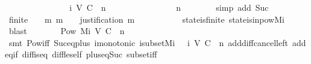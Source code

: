 \begin{isabellebody}
\ \ \isamarkupfalse%
\ {\isacharminus}\isanewline
\ \ \isamarkupfalse%
\ {\isasymsigma}\ {\isasymsigma}{\isacharprime}\isanewline
\ \ \isamarkupfalse%
\ {\isachardoublequoteopen}{\isasymsigma}{\isacharprime}\ {\isasymin}\ {\isasymSigma}i\ {\isacharparenleft}V{\isacharcomma}\ C{\isacharcomma}\ {\isasymepsilon}{\isacharparenright}\ n{\isachardoublequoteclose}\isanewline
\ \ \ {\isachardoublequoteopen}{\isasymsigma}\ {\isasymsubseteq}\ {\isasymsigma}{\isacharprime}{\isachardoublequoteclose}\ \isanewline
\ \ \ {\isachardoublequoteopen}{\isasymsigma}\ {\isasymin}\ {\isasymSigma}{\isachardoublequoteclose}\isanewline
\ \ \isamarkupfalse%
\ {\isachardoublequoteopen}n\ {\isachargreater}\ {}{\isachardoublequoteclose}\isanewline
\ \ \ \ \isamarkupfalse%
\ {\isacharparenleft}simp\ add{\isacharcolon}\ Suc{\isacharparenright}\isanewline
\ \ \isamarkupfalse%
\ {\isachardoublequoteopen}finite\ {\isasymsigma}\ {\isasymand}\ {\isacharparenleft}{\isasymforall}\ m{\isachardot}\ m\ {\isasymin}\ {\isasymsigma}\ {\isasymlongrightarrow}\ justification\ m\ {\isasymsubseteq}\ {\isasymsigma}{\isacharparenright}{\isachardoublequoteclose}\isanewline
\ \ \ \ \isamarkupfalse%
\ {\isacartoucheopen}{\isasymsigma}\ {\isasymin}\ {\isasymSigma}{\isacartoucheclose}\ state{\isacharunderscore}is{\isacharunderscore}finite\ state{\isacharunderscore}is{\isacharunderscore}in{\isacharunderscore}pow{\isacharunderscore}Mi\ \isamarkupfalse%
\ blast\isanewline
\ \ \isamarkupfalse%
\ \isamarkupfalse%
\ {\isachardoublequoteopen}{\isasymsigma}\ {\isasymin}\ Pow\ {\isacharparenleft}Mi\ {\isacharparenleft}V{\isacharcomma}\ C{\isacharcomma}\ {\isasymepsilon}{\isacharparenright}\ {\isacharparenleft}n\ {\isacharminus}\ {}{\isacharparenright}{\isacharparenright}{\isachardoublequoteclose}\isanewline
\ \ \ \ \isamarkupfalse%
\ {\isacartoucheopen}{\isasymsigma}\ {\isasymsubseteq}\ {\isasymsigma}{\isacharprime}{\isacartoucheclose}\isanewline
\ \ \ \ \isamarkupfalse%
\ {\isacharparenleft}smt\ Pow{\isacharunderscore}iff\ Suc{\isacharunderscore}eq{\isacharunderscore}plus{}\ {\isasymSigma}i{\isacharunderscore}monotonic\ {\isasymSigma}i{\isacharunderscore}subset{\isacharunderscore}Mi\ {\isacartoucheopen}{\isasymsigma}{\isacharprime}\ {\isasymin}\ {\isasymSigma}i\ {\isacharparenleft}V{\isacharcomma}\ C{\isacharcomma}\ {\isasymepsilon}{\isacharparenright}\ n{\isacartoucheclose}\ add{\isacharunderscore}diff{\isacharunderscore}cancel{\isacharunderscore}left{\isacharprime}\ add{\isacharunderscore}eq{\isacharunderscore}if\ diff{\isacharunderscore}is{\isacharunderscore}{}{\isacharunderscore}eq\ diff{\isacharunderscore}le{\isacharunderscore}self\ plus{\isacharunderscore}{}{\isacharunderscore}eq{\isacharunderscore}Suc\ subset{\isacharunderscore}iff{\isacharparenright}\isanewline

\end{isabellebody}
